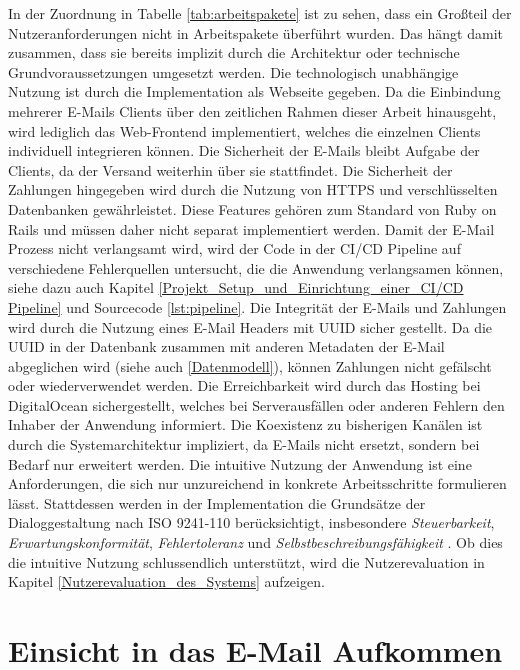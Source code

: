 In der Zuordnung in Tabelle \ref{tab:arbeitspakete} ist zu sehen, dass ein Großteil der Nutzeranforderungen nicht in Arbeitspakete überführt wurden. Das hängt damit zusammen, dass sie bereits implizit durch die Architektur oder technische Grundvoraussetzungen umgesetzt werden. Die technologisch unabhängige Nutzung ist durch die Implementation als Webseite gegeben. Da die Einbindung mehrerer E-Mails Clients über den zeitlichen Rahmen dieser Arbeit hinausgeht, wird lediglich das Web-Frontend implementiert, welches die einzelnen Clients individuell integrieren können. Die Sicherheit der E-Mails bleibt Aufgabe der Clients, da der Versand weiterhin über sie stattfindet. Die Sicherheit der Zahlungen hingegeben wird durch die Nutzung von HTTPS und verschlüsselten Datenbanken gewährleistet. Diese Features gehören zum Standard von Ruby on Rails und müssen daher nicht separat implementiert werden. Damit der E-Mail Prozess nicht verlangsamt wird, wird der Code in der CI/CD Pipeline auf verschiedene Fehlerquellen untersucht, die die Anwendung verlangsamen können, siehe dazu auch Kapitel \ref{Projekt_Setup_und_Einrichtung_einer_CI/CD Pipeline} und Sourcecode \ref{lst:pipeline}. Die Integrität der E-Mails und Zahlungen wird durch die Nutzung eines E-Mail Headers mit UUID sicher gestellt. Da die UUID in der Datenbank zusammen mit anderen Metadaten der E-Mail abgeglichen wird (siehe auch \ref{Datenmodell}), können Zahlungen nicht gefälscht oder wiederverwendet werden. Die Erreichbarkeit wird durch das Hosting bei DigitalOcean sichergestellt, welches bei Serverausfällen oder anderen Fehlern den Inhaber der Anwendung informiert. Die Koexistenz zu bisherigen Kanälen ist durch die Systemarchitektur impliziert, da E-Mails nicht ersetzt, sondern bei Bedarf nur erweitert werden. Die intuitive Nutzung der Anwendung ist eine Anforderungen, die sich nur unzureichend in konkrete Arbeitsschritte formulieren lässt. Stattdessen werden in der Implementation die Grundsätze der Dialoggestaltung nach ISO 9241-110 berücksichtigt, insbesondere \textit{Steuerbarkeit}, \textit{Erwartungskonformität}, \textit{Fehlertoleranz} und \textit{Selbstbeschreibungsfähigkeit} \citep{ISO9241-110}. Ob dies die intuitive Nutzung schlussendlich unterstützt, wird die Nutzerevaluation in Kapitel \ref{Nutzerevaluation_des_Systems} aufzeigen. 


\section{Einsicht in das E-Mail Aufkommen}
\label{Einsicht_in_das_E-Mail_Aufkommen}

